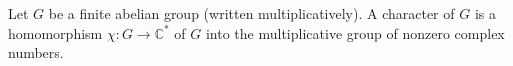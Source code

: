 Let $G$ be a finite abelian group (written multiplicatively). A character of $G$ is a homomorphism $\chi: G \to \mathbb{C}^*$ of $G$ into the multiplicative group of nonzero complex numbers.
